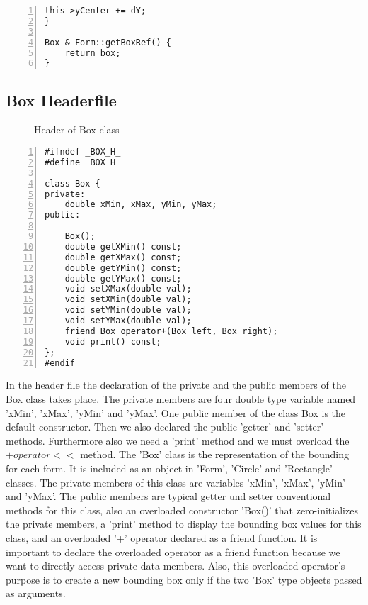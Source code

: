 \documentclass{article}
\begin{document}
\begin{lstlisting}[basicstyle=\footnotesize\ttfamily, numbers=left, stepnumber=1, numberstyle = \normalsize]
	this->yCenter += dY;
}

Box & Form::getBoxRef() {
	return box;
}
\end{lstlisting}

\subsection{Box Headerfile}
\begin{figure}
\scriptsize{\caption{Header of Box class}}
\end{figure}

\begin{lstlisting}[basicstyle=\footnotesize\ttfamily, numbers=left, stepnumber=1, numberstyle = \normalsize]
#ifndef _BOX_H_
#define _BOX_H_

class Box {
private:
	double xMin, xMax, yMin, yMax;
public:
	
	Box();
	double getXMin() const;
	double getXMax() const;
	double getYMin() const;
	double getYMax() const;
	void setXMax(double val);
	void setXMin(double val);
	void setYMin(double val);
	void setYMax(double val);
	friend Box operator+(Box left, Box right);
	void print() const;
};
#endif
\end{lstlisting}
\normalsize{In the header file the declaration of the private and the public members of the Box class takes place.\newline
\newline
The private members are four double type variable named 'xMin', 'xMax', 'yMin' and 'yMax'.\newline
One public member of the class Box is the default constructor.\newline 
Then we also declared the public 'getter' and 'setter' methods. Furthermore also we need a 'print' method and we must overload the $+operator<<$ method.\newline
\newline
The 'Box' class is the representation of the bounding for each form. It is included as an object in 'Form', 'Circle' and 'Rectangle' classes.
The private members of this class are variables 'xMin', 'xMax', 'yMin' and 'yMax'. 
The public members are typical getter und setter conventional methods for this class, also an overloaded constructor 'Box()' that zero-initializes the private members, a 'print' method to display the bounding box values for this class, and an overloaded '+' operator declared as a friend function. It is important to declare the overloaded operator as a friend function because we want to directly access private data members. 
Also, this overloaded operator's purpose is to create a new bounding box only if the two 'Box' type objects passed as arguments. 
	
}\newpage
\end{document}
